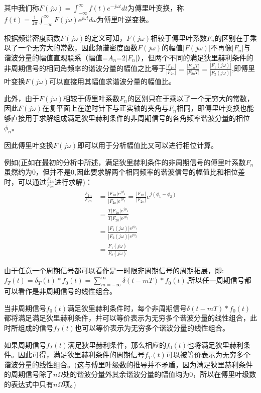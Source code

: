 \documentclass{article}
\numberwithin{equation}{section}
\numberwithin{figure}{section}
\begin{document}
其中我们称$F(j\omega)=\int_{-\infty}^{\infty}f(t)e^{-j\omega t}dt$为傅里叶变换，称$f(t)=\frac{1}{2\pi}\int_{-\infty}^{\infty}F(j\omega)e^{j\omega t}d\omega$为傅里叶逆变换。

根据频谱密度函数$F(j\omega)$的定义可知，$F(j\omega)$相较于傅里叶系数$F_n$的区别在于乘以了一个无穷大的常数，因此频谱密度函数$F(j\omega)$的幅值|$F(j\omega)$|不再像|$F_n$|与谐波分量的幅值直观联系（幅值=$A_n$=$2|F_n|$），但两个不同的满足狄里赫利条件的非周期信号的相同角频率的谐波分量的幅值之比等于$\frac{|F_{1n}|}{|F_{2n}|}=\frac{|F_{1n}T|}{|F_{2n}T|}=\frac{|F_1(j\omega)|}{|F_2(j\omega)|}$,即傅里叶变换$F(j\omega)$可以直接用其幅值求谐波分量的幅值比。

此外，由于$F(j\omega)$相较于傅里叶系数$F_n$的区别只在于乘以了一个无穷大的常数，因此$F(j\omega)$在复平面上在逆时针下与正实轴的夹角与$F_n$相同，即傅里叶变换也能够直接用于求解组成满足狄里赫利条件的非周期信号的各角频率谐波分量的相位$\phi_n$。

因此傅里叶变换$F(j\omega)$即可以用于分析幅值比又可以进行相位计算。

例如(正如在最初的分析中所述，满足狄里赫利条件的非周期信号的傅里叶系数$F_n$虽然约为0，但并不是0,因此要求解两个相同频率的谐波信号的幅值比和相位差时，可以通过$\frac{F_{1n}}{F_{2n}}$进行求解)：
\begin{equation}
    \begin{split}
        \frac{F_{1n}}{F_{2n}}&=\frac{|F_{1n}|e^{j\phi_1}}{|F_{2n}|e^{j\phi_2}}=\frac{|F_{1n}|}{|F_{2n}|}e^{j(\phi_1-\phi_2)}\\
        &=\frac{T|F_{1n}|e^{j\phi_1}}{T|F_{2n}|e^{j\phi_2}}\\
        &=\frac{|F_1(j\omega)|e^{j\phi_1}}{|F_2(j\omega)|e^{j\phi_2}}\\
        &=\frac{F_1{(j\omega)}}{F_2{(j\omega)}}\label{fuzhi&xiangwei}
    \end{split}
\end{equation}

由于任意一个周期信号都可以看作是一时限非周期信号的周期拓展，即:$f_T(t)=\delta_T(t)*f_0(t)=\sum_{m=-\infty}^{\infty}\delta(t-mT)*f_0(t)$,所以任一周期信号都可以看作是非周期信号的线性组合。

当非周期信号$f_0(t)$满足狄里赫利条件时，每个非周期信号$\delta(t-mT)*f_0(t)$都将满足满足狄里赫利条件，并可以等价表示为无穷多个谐波分量的线性组合，此时所组成的信号$f_T(t)$也可以等价表示为无穷多个谐波分量的线性组合。

如果周期信号$f_T(t)$满足狄里赫利条件，那么相应的$f_0(t)$也将满足狄里赫利条件。因此可得，满足狄里赫利条件的周期信号$f_T(t)$可以被等价表示为无穷多个谐波分量的线性组合。(这与傅里叶级数的推导并不矛盾，因为满足狄里赫利条件的周期信号除了$n\Omega$处的谐波分量外其余谐波分量的幅值均为0，所以在傅里叶级数的表达式中只有$n\Omega$项。)
\end{document}
